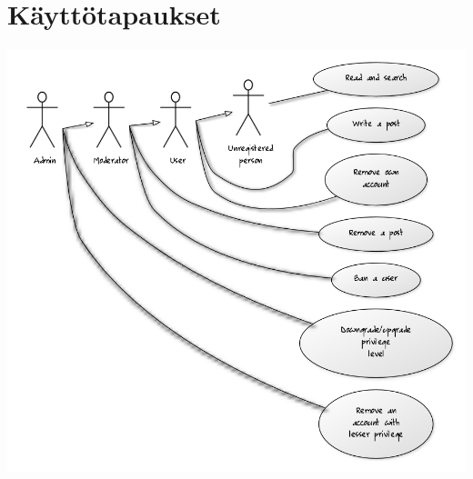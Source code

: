 \documentclass[10pt]{article}
\begin{document}
\section{Käyttötapaukset}
\includegraphics[width=\textwidth]{multilog_use_case_diagram}
\end{document}
